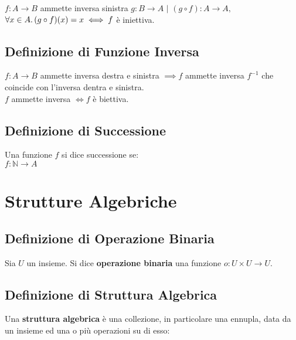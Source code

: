 \documentclass[a4paper, twoside, italian, 11pt]{book}
\newcommand{\N}{\mathbb{N}}
\begin{document}
$f : A \rightarrow B$ ammette inversa sinistra $g : B \rightarrow A$ $|$ $(g \circ f) : A \rightarrow A,$ $\forall x \in A \ldotp (g \circ f)(x) = x \iff f$ è iniettiva.



\section{Definizione di Funzione Inversa}

$f : A \rightarrow B$ ammette inversa destra e sinistra $\implies f$ ammette inversa $f^{-1}$ che coincide con l'inversa dentra e sinistra. \\

\noindent
$f$ ammette inversa $\iff f$ è biettiva.





\section{Definizione di Successione}

Una funzione $f$ si dice successione se: \\

$f : \N \rightarrow A$



\chapter{Strutture Algebriche}


\section{Definizione di Operazione Binaria}

Sia $U$ un insieme. Si dice \textbf{operazione binaria} una funzione $o : U \times U \rightarrow U$.


\section{Definizione di Struttura Algebrica}

Una \textbf{struttura algebrica} è una collezione, in particolare una ennupla, data da un insieme ed una o più operazioni su di esso: \\
\end{document}
